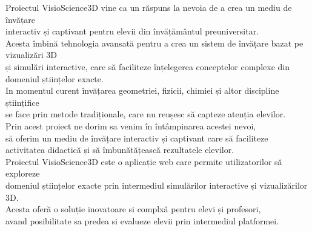 
Proiectul VisioScience3D vine ca un răspuns la nevoia de a crea un mediu de învățare\\
interactiv și captivant pentru elevii din învățământul preuniversitar.\\
Acesta îmbină tehnologia avansată pentru a crea un sistem de învățare bazat pe vizualizări 3D\\
și simulări interactive, care să faciliteze înțelegerea conceptelor complexe din domeniul științelor exacte.\\




In momentul curent învățarea geometriei, fizicii, chimiei și altor discipline științifice\\
se face prin metode tradiționale, care nu reușesc să capteze atenția elevilor.\\
Prin acest proiect ne dorim sa venim în întâmpinarea acestei nevoi,\\
să oferim un mediu de învățare interactiv și captivant care să faciliteze\\
activitatea didactică și să îmbunătățească rezultatele elevilor.\\




Proiectul VisioScience3D este o aplicație web care permite utilizatorilor să exploreze\\
domeniul științelor exacte prin intermediul simulărilor interactive și vizualizărilor 3D.\\
Acesta oferă o soluție inovatoare si complxă pentru elevi și profesori,\\
avand posibilitate sa predea si evalueze elevii prin intermediul platformei.\\